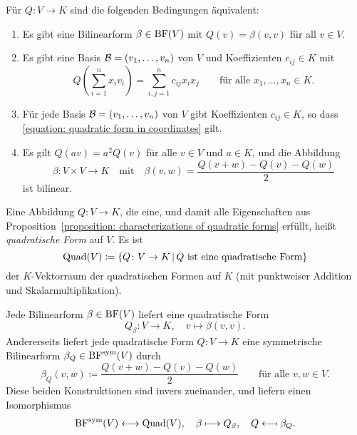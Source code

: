 \begin{proposition}
  \label{proposition: characterizations of quadratic forms}
  Für $Q \colon V \to K$ sind die folgenden Bedingungen äquivalent:
  \begin{enumerate}
    \item
      Es gibt eine Bilinearform $\beta \in \operatorname{BF}(V)$ mit $Q(v) = \beta(v, v)$ für all $v \in V$.
    \item
      Es gibt eine Basis $\mathcal{B} = (v_1, \dotsc, v_n)$ von $V$ und Koeffizienten $c_{ij} \in K$ mit
      \begin{equation}
        \label{equation: quadratic form in coordinates}
          Q\left( \sum_{i=1}^n x_i v_i \right)
        = \sum_{i,j=1}^n c_{ij} x_i x_j
        \qquad
        \text{für alle $x_1, \dotsc, x_n \in K$}.
      \end{equation}
    \item
      Für jede Basis $\mathcal{B} = (v_1, \dotsc, v_n)$ von $V$ gibt Koeffizienten $c_{ij} \in K$, so dass \eqref{equation: quadratic form in coordinates} gilt.
    \item
      Es gilt $Q(av) = a^2 Q(v)$ für alle $v \in V$ und $a \in K$, und die Abbildung
      \[
                \beta
        \colon  V \times V
        \to     K
        \quad\text{mit}\quad
          \beta(v,w)
        = \frac{ Q(v + w) - Q(v) - Q(w) }{2}
      \]
      ist bilinear.
  \end{enumerate}
\end{proposition}

\begin{definition}
  Eine Abbildung $Q \colon V \to K$, die eine, und damit alle Eigenschaften aus Proposition~\ref{proposition: characterizations of quadratic forms} erfüllt, heißt \emph{quadratische Form} auf $V$.
  Es ist
  \[
              \operatorname{Quad}(V)
    \coloneqq \{ Q \colon V \to K \,|\, \text{$Q$ ist eine quadratische Form} \}
  \]
  der $K$-Vektorraum der quadratischen Formen auf $K$ \textup(mit punktweiser Addition und Skalarmultiplikation\textup).
\end{definition}

Jede Bilinearform $\beta \in \operatorname{BF}(V)$ liefert eine quadratische Form
\[
          Q_\beta
  \colon  V
  \to     K,
  \quad   v
  \mapsto \beta(v,v).
\]
Andererseits liefert jede quadratische Form $Q \colon V \to K$ eine symmetrische Bilinearform $\beta_Q \in \operatorname{BF}^{\operatorname{sym}}(V)$ durch
\begin{equation}
  \label{equation: polarisation formula}
            \beta_Q(v,w)
  \coloneqq \frac{Q(v+w) - Q(v) - Q(w)}{2}
  \qquad
  \text{für alle $v, w \in V$}.
\end{equation}
Diese beiden Konstruktionen sind invers zueinander, und liefern einen Isomorphismus
\begin{align*}
                      \operatorname{BF}^{\operatorname{sym}}(V)
  \longleftrightarrow \operatorname{Quad}(V),
  \quad
                      \beta
  \longmapsto         Q_\beta,
  \quad
                      Q
  \longmapsfrom       \beta_Q.
\end{align*}


